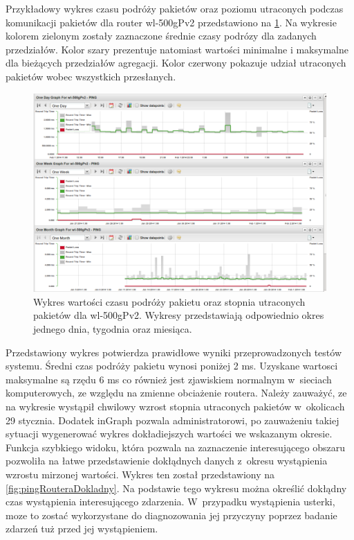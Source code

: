 Przykładowy wykres czasu podróży pakietów oraz poziomu utraconych
podczas komunikacji pakietów dla router wl-500gPv2 przedstawiono na
\ref{fig:pingRoutera}. Na wykresie kolorem zielonym zostały zaznaczone
średnie czasy podrózy dla zadanych przedziałów. Kolor szary prezentuje
natomiast wartości minimalne i maksymalne dla bieżących przedziałów
agregacji. Kolor czerwony pokazuje udział utraconych pakietów wobec
wszystkich przesłanych.

\begin{figure}[ht]
  \caption{Wykres wartości czasu podróży pakietu oraz stopnia
    utraconych pakietów dla wl-500gPv2. Wykresy przedstawiają
    odpowiednio okres jednego dnia, tygodnia oraz miesiąca.}
  \label{fig:pingRoutera}
  \centering
\includegraphics[width=1\textwidth]{img/pingRoutera.png}
\end{figure}

Przedstawiony wykres potwierdza prawidłowe wyniki przeprowadzonych
testów systemu. Średni czas podróży pakietu wynosi poniżej 2
ms. Uzyskane wartosci maksymalne są rzędu 6 ms co również jest
zjawiskiem normalnym w~sieciach komputerowych, ze względu na zmienne
obciażenie routera. Należy zauważyć, ze na wykresie wystąpił chwilowy
wzrost stopnia utraconych pakietów w~okolicach 29 stycznia. Dodatek
inGraph pozwala administratorowi, po zauważeniu takiej sytuacji
wygenerować wykres dokładiejszych wartości we wskazanym
okresie. Funkcja szybkiego widoku, która pozwala na zaznaczenie
interesującego obszaru pozwoliła na łatwe przedstawienie dokłądnych
danych z~okresu wystąpienia wzrostu mirzonej wartości. Wykres ten
został przedstawiony na \ref{fig:pingRouteraDokladny}. Na podstawie
tego wykresu można określić dokłądny czas wystąpienia interesującego
zdarzenia. W~przypadku wystąpienia usterki, moze to zostać
wykorzystane do diagnozowania jej przyczyny poprzez badanie zdarzeń
tuż przed jej wystąpieniem.

